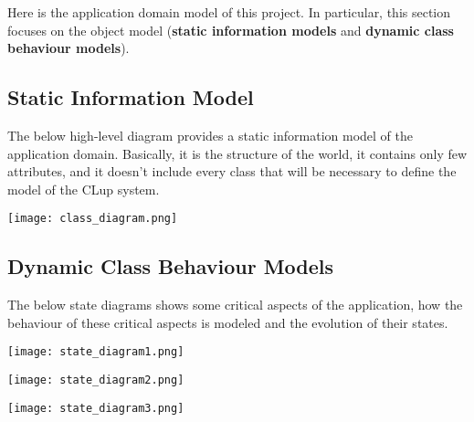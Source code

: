 Here is the application domain model of this project. In particular, this section focuses on the object model (\textbf{static information models} and \textbf{dynamic class behaviour models}).
\subsection{Static Information Model}
The below high-level diagram provides a static information model of the application domain. Basically, it is the structure of the world, it contains only few attributes, and it doesn't include every class that will be necessary to define the model of the CLup system. \newline

\texttt{[image: class\_diagram.png]}


\subsection{Dynamic Class Behaviour Models}
The below state diagrams shows some	critical aspects of	the	application, how the behaviour of these critical aspects is modeled and the evolution of their states.

\texttt{[image: state\_diagram1.png]}

\texttt{[image: state\_diagram2.png]}

\texttt{[image: state\_diagram3.png]}